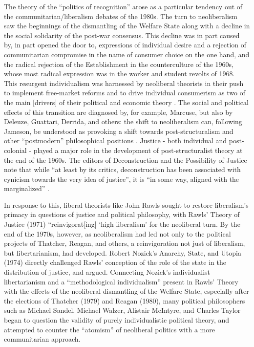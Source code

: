 \documentclass[12pt,oneside]{memoir}
\begin{document}
The theory of the ``politics of recognition'' arose as a particular tendency out of the communitarian/liberalism debates of the 1980s. The turn to neoliberalism saw the beginnings of the dismantling of the Welfare State along with a decline in the social solidarity of the post-war consensus. This decline was in part caused by, in part opened the door to, expressions of individual desire and a rejection of communitarian compromise in the name of consumer choice on the one hand, and the radical rejection of the Establishment in the counterculture of the 1960s, whose most radical expression was in the worker and student revolts of 1968. This resurgent individualism was harnessed by neoliberal theorists in their push to implement free-market reforms and to drive individual consumerism as two of the main [drivers] of their political and economic theory \citep{harvey-2005}. The social and political effects of this transition are diagnosed by, for example, Marcuse, but also by Deleuze, Guattari, Derrida, and others: the shift to neoliberalism can, following Jameson, be understood as provoking a shift towards post-structuralism and other ``postmodern'' philosophical positions \citep{Jameson1991}. Justice - both individual and post-colonial - played a major role in the development of post-structuralist theory at the end of the 1960s. The editors of Deconstruction and the Possibility of Justice note that while ``at least by its critics, deconstruction has been associated with cynicism towards the very idea of justice'', it is ``in some way, aligned with the marginalized'' \citep[ix]{CornellRosenfeldCarleson1992}.


In response to this, liberal theorists like John Rawls sought to restore liberalism's primacy in questions of justice and political philosophy, with Rawls' Theory of Justice (1971) ``reinvigorat[ing] `high liberalism' \citep[3]{Galisanka2019} for the neoliberal turn. By the end of the 1970s, however, as neoliberalism had led not only to the political projects of Thatcher, Reagan, and others, a reinvigoration not just of liberalism, but libertarianism, had developed. Robert Nozick's Anarchy, State, and Utopia (1974) directly challenged Rawls' conception of the role of the state in the distribution of justice, and argued. Connecting Nozick's individualist libertarianism and a ``methodological individualism'' present in Rawls' Theory with the effects of the neoliberal dismantling of the Welfare State, especially after the elections of Thatcher (1979) and Reagan (1980), many political philosophers such as Michael Sandel, Michael Walzer, Alistair McIntyre, and  Charles Taylor began to question the validity of purely individualistic political theory, and attempted to counter the ``atomism'' \citep{Taylor1985} of neoliberal politics with a more communitarian approach.
\end{document}
